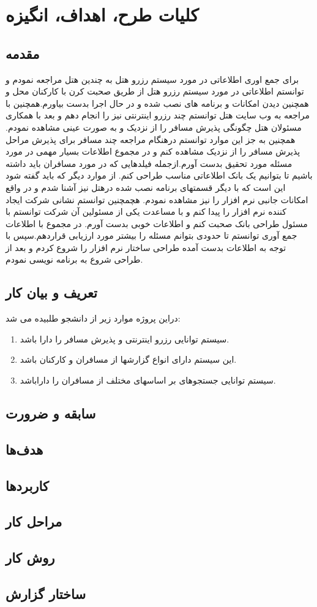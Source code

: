 \chapter{کلیات طرح، اهداف، انگیزه}
\section*{مقدمه}
 برای جمع اوری اطلاعاتی در مورد سیستم رزرو هتل به چندین هتل مراجعه نمودم و توانستم اطلاعاتی در مورد سیستم رزرو هتل از طریق صحبت کرن با کارکنان محل و همچنین دیدن امکانات و برنامه های نصب شده و در حال اجرا بدست بیاورم.همچنین با مراجعه به وب سایت هتل توانستم چند رزرو اینترنتی نیز را انجام دهم و بعد با همکاری مسئولان هتل چگونگی پذیرش مسافر را از نزدیک و به صورت عینی مشاهده نمودم. همچنین  به جز این موارد توانستم درهنگام مراجعه چند مسافر برای پذیرش مراحل پذیرش مسافر را از نزدیک مشاهده کنم و در مجموع اطلاعات بسیار مهمی در مورد مسئله مورد تحقیق بدست آورم.ازجمله فیلدهایی که در مورد مسافران باید داشته باشیم تا بتوانیم یک بانک اطلاعاتی مناسب طراحی کنم.
از موارد دیگر که باید گفته شود این است که با دیگر قسمتهای برنامه نصب شده درهتل نیز آشنا شدم و در واقع امکانات جانبی نرم افزار را نیز مشاهده نمودم.
هچمچنین توانستم نشانی شرکت ایجاد کننده نرم افزار را پیدا کنم و با مساعدت یکی از مسئولین آن شرکت توانستم با مسئول طراحی بانک صحبت کنم و اطلاعات خوبی بدست آورم. در مجموع با اطلاعات جمع آوری توانستم تا حدودی بتوانم مسئله را بیشتر مورد ارزیابی قراردهم.سپس با توجه به اطلاعات بدست آمده   طراحی ساختار نرم افزار را شروع کردم و بعد از طراحی شروع به برنامه نویسی نمودم.

\section{تعریف و بیان کار}
دراین پروژه موارد زیر از دانشجو طلبیده می شد:
\begin{enumerate}
	\item
سیستم توانایی رزرو اینترنتی و پذیرش مسافر را دارا باشد.
\item
این سیستم دارای انواع گزارشها از مسافران و کارکنان باشد.
\item
سیستم توانایی جستجوهای بر اساسهای مختلف از مسافران  را داراباشد.
\end{enumerate}

\section{سابقه و ضرورت}
\section{هدف‌ها}
\section{کاربردها}
\section{مراحل کار}
\section{روش کار}
\section{ساختار گزارش}
